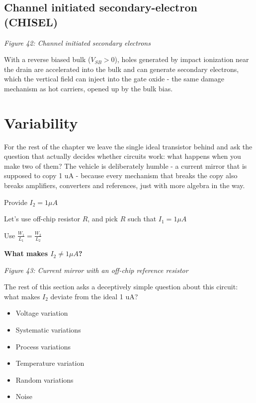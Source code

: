 \subsection{Channel initiated secondary-electron
(CHISEL)}\label{channel-initiated-secondary-electron-chisel}


{
\centering
{}
}

\emph{Figure 42: Channel initiated secondary electrons}

With a reverse biased bulk (\(V_{SB} > 0\)), holes generated by impact
ionization near the drain are accelerated into the bulk and can generate
secondary electrons, which the vertical field can inject into the gate
oxide - the same damage mechanism as hot carriers, opened up by the bulk
bias.

\section{Variability}\label{variability}

For the rest of the chapter we leave the single ideal transistor behind
and ask the question that actually decides whether circuits work: what
happens when you make two of them? The vehicle is deliberately humble -
a current mirror that is supposed to copy 1 uA - because every mechanism
that breaks the copy also breaks amplifiers, converters and references,
just with more algebra in the way.

Provide \(I_2 = 1 \mu A\)

Let's use off-chip resistor \(R\), and pick \(R\) such that
\(I_1 = 1 \mu A\)

Use \(\frac{W_1}{L_1} = \frac{W_2}{L_2}\)

\textbf{What makes \(I_2 \ne 1 \mu A\)?}


{
\centering
{}
}

\emph{Figure 43: Current mirror with an off-chip reference resistor}

The rest of this section asks a deceptively simple question about this
circuit: what makes \(I_2\) deviate from the ideal 1 uA?

\begin{itemize}
\tightlist
\item
  Voltage variation
\item
  Systematic variations
\item
  Process variations
\item
  Temperature variation
\item
  Random variations
\item
  Noise
\end{itemize}

